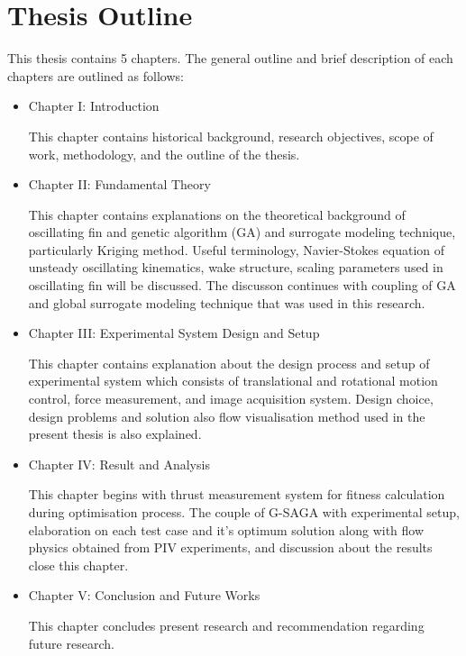 \section{Thesis Outline}
\label{sec:5}
This thesis contains 5 chapters. The general outline and brief description of each chapters are outlined as follows:
\begin{itemize}
    \item Chapter I: Introduction

    This chapter contains historical background, research objectives, scope of work, methodology, and the outline of the thesis.
    \item Chapter II: Fundamental Theory

    This chapter contains explanations on the theoretical background of oscillating fin and genetic algorithm (GA) and surrogate modeling technique, particularly Kriging method. Useful terminology, Navier-Stokes equation of unsteady oscillating kinematics, wake structure, scaling parameters used in oscillating fin will be discussed. The discusson continues with coupling of GA and global surrogate modeling technique that was used in this research.
    \item Chapter III: Experimental System Design and Setup

    This chapter contains explanation about the design process and setup of experimental system which consists of translational and rotational motion control, force measurement, and image acquisition system. Design choice, design problems and solution also flow visualisation method used in the present thesis is also explained.
    \item Chapter IV: Result and Analysis

    This chapter begins with thrust measurement system for fitness calculation during optimisation process. The couple of G-SAGA with experimental setup, elaboration on each test case and it's optimum solution along with flow physics obtained from PIV experiments, and discussion about the results close this chapter.
    \item Chapter V: Conclusion and Future Works

    This chapter concludes present research and recommendation regarding future research.
\end{itemize}